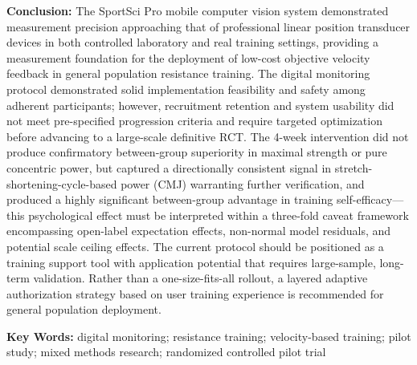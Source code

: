 \textbf{Conclusion:} The SportSci Pro mobile computer vision system demonstrated measurement precision approaching that of professional linear position transducer devices in both controlled laboratory and real training settings, providing a measurement foundation for the deployment of low-cost objective velocity feedback in general population resistance training. The digital monitoring protocol demonstrated solid implementation feasibility and safety among adherent participants; however, recruitment retention and system usability did not meet pre-specified progression criteria and require targeted optimization before advancing to a large-scale definitive RCT. The 4-week intervention did not produce confirmatory between-group superiority in maximal strength or pure concentric power, but captured a directionally consistent signal in stretch-shortening-cycle-based power (CMJ) warranting further verification, and produced a highly significant between-group advantage in training self-efficacy---this psychological effect must be interpreted within a three-fold caveat framework encompassing open-label expectation effects, non-normal model residuals, and potential scale ceiling effects. The current protocol should be positioned as a training support tool with application potential that requires large-sample, long-term validation. Rather than a one-size-fits-all rollout, a layered adaptive authorization strategy based on user training experience is recommended for general population deployment.


\textbf{Key Words:} digital monitoring; resistance training; velocity-based training; pilot study; mixed methods research; randomized controlled pilot trial
